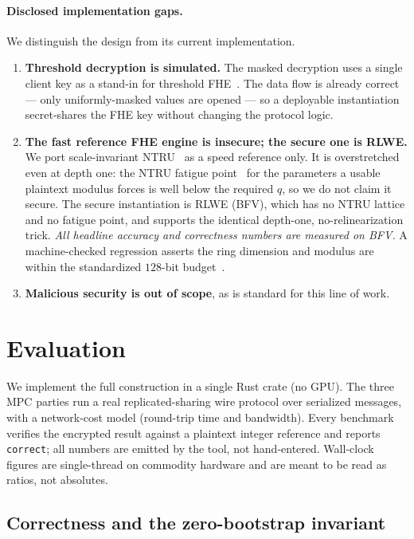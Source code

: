 \documentclass[11pt]{article}
\theoremstyle{plain}
\theoremstyle{definition}
\theoremstyle{remark}
\begin{document}
\paragraph{Disclosed implementation gaps.} We distinguish the design from
its current implementation.
\begin{enumerate}
\item \textbf{Threshold decryption is simulated.} The masked decryption uses
a single client key as a stand-in for threshold FHE~\cite{AsharovMHE}. The
data flow is already correct --- only uniformly-masked values are opened ---
so a deployable instantiation secret-shares the FHE key without changing the
protocol logic.
\item \textbf{The fast reference FHE engine is insecure; the secure one is
RLWE.} We port scale-invariant NTRU~\cite{LTV,YASHE} as a speed reference
only. It is overstretched even at depth one: the NTRU fatigue
point~\cite{ABDucas,KirchnerFouque,DucasvanWoerden} for the parameters a
usable plaintext modulus forces is well below the required $q$, so we do not
claim it secure. The secure instantiation is RLWE (BFV), which has no NTRU
lattice and no fatigue point, and supports the identical depth-one,
no-relinearization trick. \emph{All headline accuracy and correctness numbers
are measured on BFV.} A machine-checked regression asserts the ring
dimension and modulus are within the standardized $128$-bit
budget~\cite{HEStandard}.
\item \textbf{Malicious security is out of scope}, as is standard for this
line of work.
\end{enumerate}

\section{Evaluation}\label{sec:eval}

We implement the full construction in a single Rust crate (no GPU). The
three MPC parties run a real replicated-sharing wire protocol over serialized
messages, with a network-cost model (round-trip time and bandwidth). Every
benchmark verifies the encrypted result against a plaintext integer reference
and reports \texttt{correct}; all numbers are emitted by the tool, not
hand-entered. Wall-clock figures are single-thread on commodity hardware and
are meant to be read as ratios, not absolutes.

\subsection{Correctness and the zero-bootstrap invariant}
\end{document}
